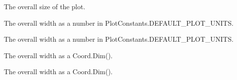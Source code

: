 \documentclass[letterpaper,10pt,english]{sphinxmanual}
\begin{document}
\begin{fulllineitems}
\begin{fulllineitems}
\end{fulllineitems}


\begin{fulllineitems}
\label{\detokenize{ref/util/plot/Plot:TotalDepth.util.plot.Plot.PlotRoll.viewBox}}
The overall size of the plot.

\end{fulllineitems}


\begin{fulllineitems}
\label{\detokenize{ref/util/plot/Plot:TotalDepth.util.plot.Plot.PlotRoll.width}}
The overall width as a number in PlotConstants.DEFAULT\_PLOT\_UNITS.

\end{fulllineitems}


\begin{fulllineitems}
\label{\detokenize{ref/util/plot/Plot:TotalDepth.util.plot.Plot.PlotRoll.depth}}
The overall width as a number in PlotConstants.DEFAULT\_PLOT\_UNITS.

\end{fulllineitems}


\begin{fulllineitems}
\label{\detokenize{ref/util/plot/Plot:TotalDepth.util.plot.Plot.PlotRoll.widthDim}}
The overall width as a Coord.Dim().

\end{fulllineitems}


\begin{fulllineitems}
\label{\detokenize{ref/util/plot/Plot:TotalDepth.util.plot.Plot.PlotRoll.depthDim}}
The overall width as a Coord.Dim().

\end{fulllineitems}



\end{fulllineitems}
\end{document}
